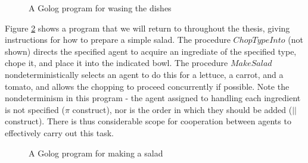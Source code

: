 %
\begin{figure}
\begin{centering}
\par\end{centering}

\caption{A Golog program for wasing the dishes\label{fig:Background:Golog:Washing-Dishes}}

\end{figure}


Figure \ref{fig:Background:Golog:MakeSalad} shows a program that
we will return to throughout the thesis, giving instructions for how
to prepare a simple salad. The procedure $ChopTypeInto$ (not shown)
directs the specified agent to acquire an ingrediate of the specified
type, chope it, and place it into the indicated bowl. The procedure
$MakeSalad$ nondeterministically selects an agent to do this for
a lettuce, a carrot, and a tomato, and allows the chopping to proceed
concurrently if possible. Note the nondeterminism in this program
- the agent assigned to handling each ingredient is not specified
($\pi$ construct), nor is the order in which they should be added
($||$ construct). There is thus considerable scope for cooperation
between agents to effectively carry out this task.

%
\begin{figure}
\begin{centering}
\par\end{centering}

\caption{A Golog program for making a salad\label{fig:Background:Golog:MakeSalad}}

\end{figure}



